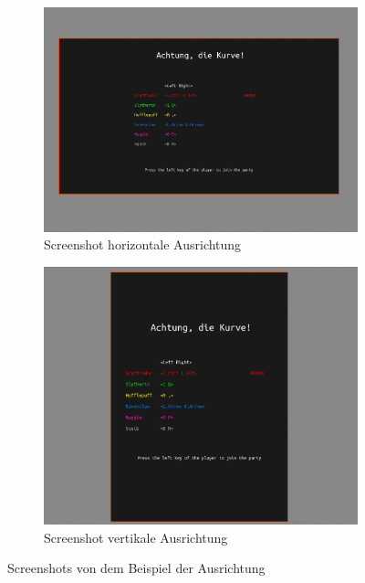 \documentclass[doktyp=studarbeit]{TUBAFarbeiten}
\begin{document}
\begin{figure}[!htb]
    \centering
    \begin{subfigure}[b]{0.517\textwidth}
        \centering
        \includegraphics[width=1\linewidth]{aspect-ratio-1.png}
        \caption{Screenshot horizontale Ausrichtung}
    \end{subfigure}
    \begin{subfigure}[b]{0.45\textwidth}
        \centering
        \includegraphics[width=1\linewidth]{aspect-ratio-2.png}
        \caption{Screenshot vertikale Ausrichtung}
    \end{subfigure}
    \caption{Screenshots von dem Beispiel der Ausrichtung}
	\label{fig:display-aspect-ratio}
\end{figure}
\end{document}
